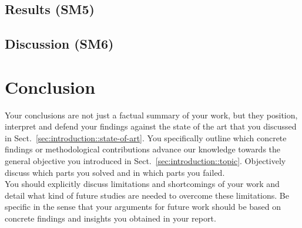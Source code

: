 \documentclass[
	a4paper,
	pagesize,
	pdftex,
	12pt,
	ngerman,
	fleqn,
	final,
	]{scrartcl}
\theoremstyle{plain}
\theoremstyle{definition}
\begin{document}
	\subsection{Results (SM5)}
	
	\subsection{Discussion (SM6)}

\section{Conclusion}
		Your conclusions are not just a factual summary of your work, but they position, interpret and defend your findings against the state of the art that you discussed in Sect.~\ref{sec:introduction::state-of-art}. You specifically outline which concrete findings or methodological contributions advance our knowledge towards the general objective you introduced in Sect.~\ref{sec:introduction::topic}. Objectively discuss which parts you solved and in which parts you failed. \\
		You should explicitly discuss limitations and shortcomings of your work and detail what kind of future studies are needed to overcome these limitations. Be specific in the sense that your arguments for future work should be based on concrete findings and insights you obtained in your report.






\selbstaendigkeitserklaerung{\today}
\end{document}
